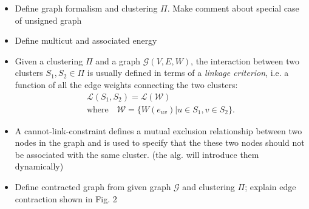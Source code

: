 \begin{itemize}
\item Define graph formalism and clustering $\Pi$. Make comment about special case of unsigned graph
\item Define multicut and associated energy

\item Given a clustering $\Pi$ and a graph $\mathcal{G}(V,E,W)$, the interaction between two clusters $S_1, S_2 \in \Pi$ is usually defined in terms of a \emph{linkage criterion}, i.e. a function of all the edge weights connecting the two clusters:
\begin{equation} \label{eq:linkage_criterion_def}
\begin{gathered}
\mathcal{L}(S_1,S_2) = \mathcal{L}(\mathcal{W})\quad \\
   \text{where} \quad \mathcal{W} = \{ W(e_{uv})| u\in S_1, v\in S_2 \}.
\end{gathered}
\end{equation}

\item A cannot-link-constraint defines a mutual exclusion relationship between two nodes in the graph and is used to specify that the these two nodes should not be associated with the same cluster. (the alg. will introduce them dynamically)
\item Define contracted graph from given graph  $\mathcal{G}$ and clustering $\Pi$; explain edge contraction shown in Fig. 2

\end{itemize}


